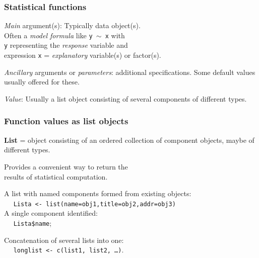 \documentclass[handout,12pt]{beamer}
\begin{document}
\begin{frame}\frametitle{Statistical functions}
\bi
\item   {\it Main} argument(s): Typically data object(s). \\
        Often a {\it model formula}
        like {\tt y $\sim$ x} with \\ {\tt y} representing 
        the \emph{response} variable and \\
        expression {\tt x} = \emph{explanatory} variable(s) or factor(s).
        \medskip
\item
  \emph{Ancillary} arguments or \emph{parameters}: additional specifications.
    Some default values usually offered for these.
    \medskip
\item
  {\it Value}: Usually a {list} object consisting of several
  components of different types. %
\ei
\end{frame} 


\begin{frame}\frametitle{Function values as list objects}

\bi
\item {\bf List} = object consisting of an ordered collection of component objects, 
maybe of different types.
\medskip
\item
Provides a convenient way to return the \\
results of statistical computation.
\medskip
\item
A list with named components formed from existing objects: \\
\small 
${ }\quad $ {\small\tt Lista <- list(name=obj1,title=obj2,addr=obj3)} \\
\normalsize
A single component identified: \\
${ } \quad$ {\small\tt Lista{\$}name};
\medskip
\item
Concatenation of several lists into one: \\
${ }\quad$ \small  {\tt longlist <- c(list1, list2, \dots)}.
\normalsize
\ei
\end{frame} 

\end{document}
